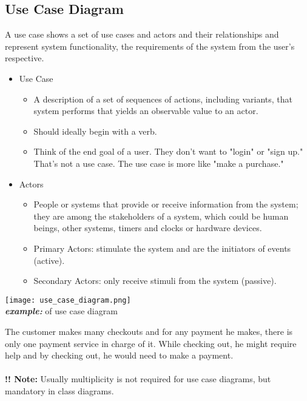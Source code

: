 \documentclass[a4paper]{article}
\begin{document}
\subsection{Use Case Diagram}
A use case shows a set of use cases and actors and their relationships and represent system functionality, the requirements of the system from the user’s respective.
\begin{itemize}
	\item Use Case
	\begin{itemize}[label=$\circ$]
		\item A description of a set of sequences of actions, including variants, that system performs that yields an observable value to an actor.
		\item Should ideally begin with a verb.
		\item Think of the end goal of a user. They don't want to "login" or "sign up." That's not a use case. The use case is more like "make a purchase."
	\end{itemize}
	\item Actors
	\begin{itemize}[label=$\circ$]
		\item People or systems that provide or receive information from the system; they are among the stakeholders of a system, which could be human beings, other systems, timers and clocks or hardware devices.
		\item Primary Actors: stimulate the system and are the initiators of events (active).
		\item Secondary Actors: only receive stimuli from the system (passive).
	\end{itemize}
\end{itemize}
\begin{center}
	\texttt{[image: use\_case\_diagram.png]}\\
	\textbf{\textit{example:}} of use case diagram
\end{center}
The customer makes many checkouts and for any payment he makes, there is only one payment service in charge of it. While checking out, he might require help and by checking out, he would need to make a payment.\\
\\
	\textbf{!! Note:} Usually multiplicity is not required for use case diagrams, but mandatory in class diagrams.
\end{document}
